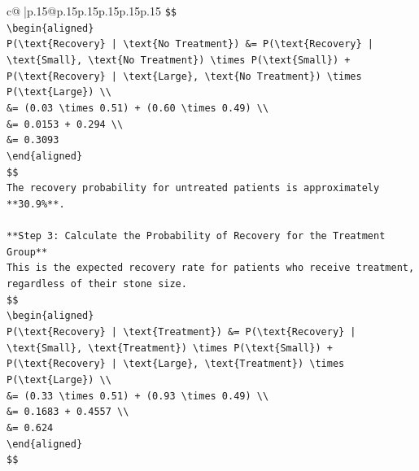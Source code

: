 \documentclass{article}
\begin{document}
{\begin{supertabular}{c@{$\;$}|p{.15\linewidth}@{}p{.15\linewidth}p{.15\linewidth}p{.15\linewidth}p{.15\linewidth}p{.15\linewidth}}
{{{\texttt{\$\$} \\
\texttt{\textbackslash{}begin\{aligned\}} \\
\texttt{P(\textbackslash{}text\{Recovery\} | \textbackslash{}text\{No Treatment\}) \&= P(\textbackslash{}text\{Recovery\} | \textbackslash{}text\{Small\}, \textbackslash{}text\{No Treatment\}) \textbackslash{}times P(\textbackslash{}text\{Small\}) + P(\textbackslash{}text\{Recovery\} | \textbackslash{}text\{Large\}, \textbackslash{}text\{No Treatment\}) \textbackslash{}times P(\textbackslash{}text\{Large\}) \textbackslash{}\textbackslash{}} \\
\texttt{\&= (0.03 \textbackslash{}times 0.51) + (0.60 \textbackslash{}times 0.49) \textbackslash{}\textbackslash{}} \\
\texttt{\&= 0.0153 + 0.294 \textbackslash{}\textbackslash{}} \\
\texttt{\&= 0.3093} \\
\texttt{\textbackslash{}end\{aligned\}} \\
\texttt{\$\$} \\
\texttt{The recovery probability for untreated patients is approximately **30.9\%**.} \\
\\ 
\texttt{**Step 3: Calculate the Probability of Recovery for the Treatment Group**} \\
\texttt{This is the expected recovery rate for patients who receive treatment, regardless of their stone size.} \\
\texttt{\$\$} \\
\texttt{\textbackslash{}begin\{aligned\}} \\
\texttt{P(\textbackslash{}text\{Recovery\} | \textbackslash{}text\{Treatment\}) \&= P(\textbackslash{}text\{Recovery\} | \textbackslash{}text\{Small\}, \textbackslash{}text\{Treatment\}) \textbackslash{}times P(\textbackslash{}text\{Small\}) + P(\textbackslash{}text\{Recovery\} | \textbackslash{}text\{Large\}, \textbackslash{}text\{Treatment\}) \textbackslash{}times P(\textbackslash{}text\{Large\}) \textbackslash{}\textbackslash{}} \\
\texttt{\&= (0.33 \textbackslash{}times 0.51) + (0.93 \textbackslash{}times 0.49) \textbackslash{}\textbackslash{}} \\
\texttt{\&= 0.1683 + 0.4557 \textbackslash{}\textbackslash{}} \\
\texttt{\&= 0.624} \\
\texttt{\textbackslash{}end\{aligned\}} \\
\texttt{\$\$} \\
}}}
\end{supertabular}}
\end{document}
